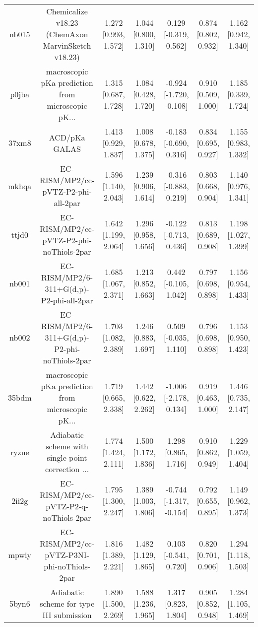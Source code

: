 \documentclass{article}
\begin{document}
\begin{center}
\begin{longtable}{|ccccccc|}
 nb015 &  Chemicalize v18.23 (ChemAxon MarvinSketch v18.23) &  1.272 [0.993, 1.572] &  1.044 [0.800, 1.310] &    0.129 [-0.319, 0.562] &  0.874 [0.802, 0.932] &   1.162 [0.942, 1.340] \\
 p0jba &  macroscopic pKa prediction from microscopic pK... &  1.315 [0.687, 1.728] &  1.084 [0.428, 1.720] &  -0.924 [-1.720, -0.108] &  0.910 [0.509, 1.000] &   1.185 [0.339, 1.724] \\
 37xm8 &                                      ACD/pKa GALAS &  1.413 [0.929, 1.837] &  1.008 [0.678, 1.375] &   -0.183 [-0.690, 0.316] &  0.834 [0.695, 0.927] &   1.155 [0.983, 1.332] \\
 mkhqa &                EC-RISM/MP2/cc-pVTZ-P2-phi-all-2par &  1.596 [1.140, 2.043] &  1.239 [0.906, 1.614] &   -0.316 [-0.883, 0.219] &  0.803 [0.668, 0.904] &   1.140 [0.976, 1.341] \\
 ttjd0 &           EC-RISM/MP2/cc-pVTZ-P2-phi-noThiols-2par &  1.642 [1.199, 2.064] &  1.296 [0.958, 1.656] &   -0.122 [-0.713, 0.436] &  0.813 [0.689, 0.908] &   1.198 [1.027, 1.399] \\
 nb001 &           EC-RISM/MP2/6-311+G(d,p)-P2-phi-all-2par &  1.685 [1.067, 2.371] &  1.213 [0.852, 1.663] &    0.442 [-0.105, 1.042] &  0.797 [0.698, 0.898] &   1.156 [0.954, 1.433] \\
 nb002 &      EC-RISM/MP2/6-311+G(d,p)-P2-phi-noThiols-2par &  1.703 [1.082, 2.389] &  1.246 [0.883, 1.697] &    0.509 [-0.035, 1.110] &  0.796 [0.698, 0.898] &   1.153 [0.950, 1.423] \\
 35bdm &  macroscopic pKa prediction from microscopic pK... &  1.719 [0.665, 2.338] &  1.442 [0.622, 2.262] &   -1.006 [-2.178, 0.134] &  0.919 [0.463, 1.000] &   1.446 [0.735, 2.147] \\
 ryzue &  Adiabatic scheme with single point correction ... &  1.774 [1.424, 2.111] &  1.500 [1.172, 1.836] &     1.298 [0.865, 1.716] &  0.910 [0.862, 0.949] &   1.229 [1.059, 1.404] \\
 2ii2g &             EC-RISM/MP2/cc-pVTZ-P2-q-noThiols-2par &  1.795 [1.300, 2.247] &  1.389 [1.003, 1.806] &  -0.744 [-1.317, -0.154] &  0.792 [0.655, 0.895] &   1.149 [0.962, 1.373] \\
 mpwiy &         EC-RISM/MP2/cc-pVTZ-P3NI-phi-noThiols-2par &  1.816 [1.389, 2.221] &  1.482 [1.129, 1.865] &    0.103 [-0.541, 0.720] &  0.820 [0.701, 0.906] &   1.294 [1.118, 1.503] \\
 5byn6 &           Adiabatic scheme for type III submission &  1.890 [1.500, 2.269] &  1.588 [1.236, 1.965] &     1.317 [0.823, 1.804] &  0.905 [0.852, 0.948] &   1.284 [1.105, 1.469] \\

\end{longtable}
\end{center}
\end{document}
